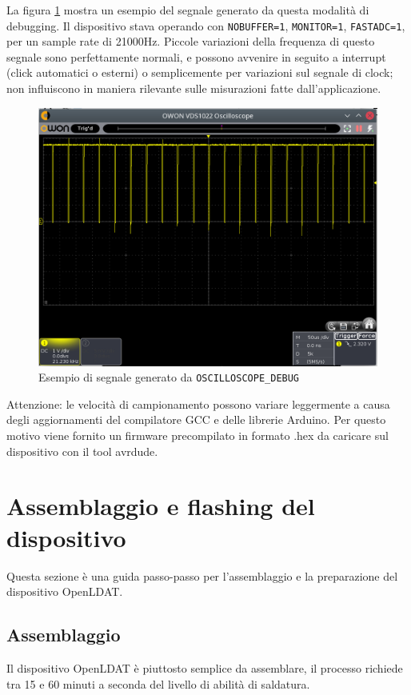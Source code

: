 La figura \ref{fig:oscilloscopedebug} mostra un esempio del segnale generato da questa modalità di debugging. Il dispositivo stava operando con \texttt{NOBUFFER=1}, \texttt{MONITOR=1}, \texttt{FASTADC=1}, per un sample rate di 21000Hz. Piccole variazioni della frequenza di questo segnale sono perfettamente normali, e possono avvenire in seguito a interrupt (click automatici o esterni) o semplicemente per variazioni sul segnale di clock; non influiscono in maniera rilevante sulle misurazioni fatte dall'applicazione.

\begin{figure}[h]
	\centering
	\includegraphics[width=\textwidth]{Dispositivo_files/scope.png}
	\caption{Esempio di segnale generato da \texttt{OSCILLOSCOPE\_DEBUG}}
	\label{fig:oscilloscopedebug}
\end{figure}

Attenzione: le velocità di campionamento possono variare leggermente a causa degli aggiornamenti del compilatore GCC e delle librerie Arduino. Per questo motivo viene fornito un firmware precompilato in formato .hex da caricare sul dispositivo con il tool avrdude.

\section{Assemblaggio e flashing del dispositivo}
Questa sezione è una guida passo-passo per l'assemblaggio e la preparazione del dispositivo OpenLDAT.

\subsection{Assemblaggio}
Il dispositivo OpenLDAT è piuttosto semplice da assemblare, il processo richiede tra 15 e 60 minuti a seconda del livello di abilità di saldatura.

